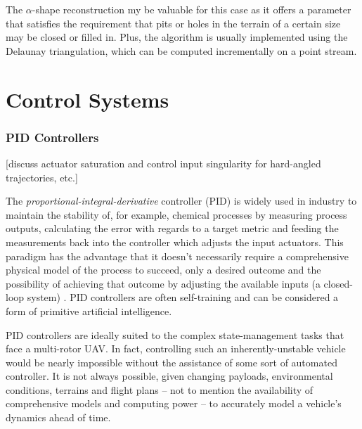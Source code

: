 The $\alpha$-shape reconstruction my be valuable for this case as it offers a parameter that satisfies the requirement that pits or holes in the terrain of a certain size may be closed or filled in. Plus, the algorithm is usually implemented using the Delaunay triangulation, which can be computed incrementally on a point stream.
\section{Control Systems}


\subsubsection{PID Controllers}

[discuss actuator saturation and control input singularity for hard-angled trajectories, etc.]


The \emph{proportional-integral-derivative} controller (PID) is widely used in industry \cite{Soediono1989} to maintain the stability of, for example, chemical processes by measuring process outputs, calculating the error with regards to a target metric and feeding the measurements back into the controller which adjusts the input actuators. This paradigm has the advantage that it doesn’t necessarily require a comprehensive physical model of the process to succeed, only a desired outcome and the possibility of achieving that outcome by adjusting the available inputs (a closed-loop system) \cite{Soediono1989}. PID controllers are often self-training and can be considered a form of primitive artificial intelligence.

PID controllers are ideally suited to the complex state-management tasks that face a multi-rotor UAV. In fact, controlling such an inherently-unstable vehicle would be nearly impossible without the assistance of some sort of automated controller. It is not always possible, given changing payloads, environmental conditions, terrains and flight plans -- not to mention the availability of comprehensive models and computing power -- to accurately model a vehicle’s dynamics ahead of time. 

